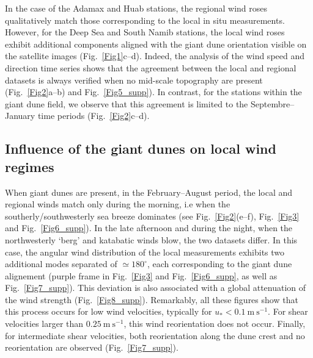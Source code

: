   In the case of the Adamax and Huab stations, the regional wind roses qualitatively match those corresponding to the local in situ measurements. However, for the Deep Sea and South Namib stations, the local wind roses exhibit additional components aligned with the giant dune orientation visible on the satellite images (Fig.~\ref{Fig1}c--d).
  Indeed, the analysis of the wind speed and direction time series shows that the agreement between the local and regional datasets is always verified when no mid-scale topography are present (Fig.~\ref{Fig2}a--b) and Fig.~\ref{Fig5_supp}). In contrast, for the stations within the giant dune field, we observe that this agreement is limited to the Septembre--January time periods (Fig.~\ref{Fig2}c--d).

  \subsection{Influence of the giant dunes on local wind regimes}

  When giant dunes are present, in the February--August period, the local and regional winds match only during the morning, i.e when the southerly/southwesterly sea breeze dominates (see Fig.~\ref{Fig2}(e--f), Fig.~\ref{Fig3} and Fig.~\ref{Fig6_supp}). In the late afternoon and during the night, when the northwesterly `berg' and katabatic winds blow, the two datasets differ. In this case, the angular wind distribution of the local measurements exhibits two additional modes separated of $\simeq 180^\circ$, each corresponding to the giant dune alignement (purple frame in Fig.~\ref{Fig3} and Fig.~\ref{Fig6_supp}, as well as Fig.~\ref{Fig7_supp}). This deviation is also associated with a global attenuation of the wind strength (Fig.~\ref{Fig8_supp}). Remarkably, all these figures show that this process occurs for low wind velocities, typically for $u_{*} < 0.1~\textrm{m}~\textrm{s}^{-1}$. For shear velocities larger than $0.25~\textrm{m}~\textrm{s}^{-1}$, this wind reorientation does not occur. Finally, for intermediate shear velocities, both reorientation along the dune crest and no reorientation are observed (Fig.~\ref{Fig7_supp}).


